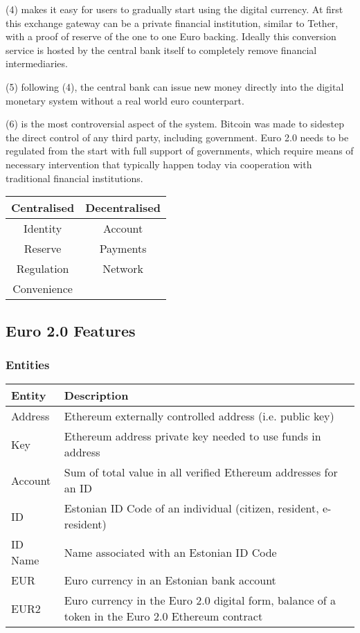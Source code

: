 \documentclass[12pt]{article} %
\begin{document}
{{(4) makes it easy for users to gradually start using the digital currency. At first this exchange gateway can be a private financial institution, similar to Tether\cite{tether2016whitepaper}, with a proof of reserve of the one to one Euro backing. Ideally this conversion service is hosted by the central bank itself to completely remove financial intermediaries.

(5) following (4), the central bank can issue new money directly into the digital monetary system without a real world euro counterpart.

(6) is the most controversial aspect of the system. Bitcoin was made to sidestep the direct control of any third party, including government\cite{nakamoto2008bitcoin}. Euro 2.0 needs to be regulated from the start with full support of governments, which require means of necessary intervention that typically happen today via cooperation with traditional financial institutions.

\begin{center}
\begin{tabular}{ |c|c| } 
 \hline
 Centralised & Decentralised \\
 \hline
 Identity & Account \\
 Reserve & Payments \\
 Regulation & Network \\
 Convenience & \\
 \hline
\end{tabular}
\end{center}

\subsection{Euro 2.0 Features} \label{ssec:3.3}

\subsubsection{Entities} \label{sssec:3.3:entities}
\begin{center}
\begin{tabular}{ | p{3cm} | p{12cm} | } 
 \hline
 Entity & Description \\
 \hline\hline
 Address & Ethereum externally controlled address (i.e. public key) \\
 \hline
 Key & Ethereum address private key needed to use funds in address \\
 \hline
 Account & Sum of total value in all verified Ethereum addresses for an ID \\
 \hline
 ID & Estonian ID Code of an individual (citizen, resident, e-resident) \\
 \hline
 ID Name & Name associated with an Estonian ID Code \\
 \hline
 EUR & Euro currency in an Estonian bank account \\
 \hline
 EUR2 & Euro currency in the Euro 2.0 digital form, balance of a token in the Euro 2.0 Ethereum contract \\ 
 \hline
\end{tabular}
\end{center}


}}
\end{document}
